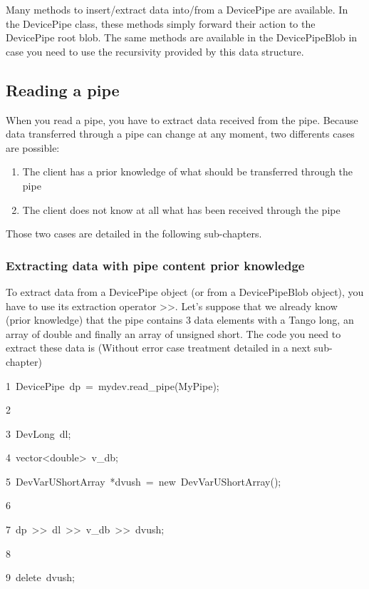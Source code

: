 Many methods to insert/extract data into/from a DevicePipe are available.
In the DevicePipe class, these methods simply forward their action
to the DevicePipe root blob. The same methods are available in the
DevicePipeBlob in case you need to use the recursivity provided by
this data structure.

\subsection{Reading a pipe}

When you read a pipe, you have to extract data received from the pipe.
Because data transferred through a pipe can change at any moment,
two differents cases are possible:
\begin{enumerate}
\item The client has a prior knowledge of what should be transferred through
the pipe
\item The client does not know at all what has been received through the
pipe
\end{enumerate}
Those two cases are detailed in the following sub-chapters.

\subsubsection{Extracting data with pipe content prior knowledge}

To extract data from a DevicePipe object (or from a DevicePipeBlob
object), you have to use its extraction operator \textquotedbl{}>\textcompwordmark{}>\textquotedbl{}.
Let's suppose that we already know (prior knowledge) that the pipe
contains 3 data elements with a Tango long, an array of double and
finally an array of unsigned short. The code you need to extract these
data is (Without error case treatment detailed in a next sub-chapter)


\begin{lyxcode}
1~DevicePipe~dp~=~mydev.read\_pipe(\textquotedbl{}MyPipe\textquotedbl{});

2~

3~DevLong~dl;~~

4~vector<double>~v\_db;~~

5~DevVarUShortArray~{*}dvush~=~new~DevVarUShortArray();

6~

7~dp~>\textcompwordmark{}>~dl~>\textcompwordmark{}>~v\_db~>\textcompwordmark{}>~dvush;

8

9~delete~dvush;
\end{lyxcode}


